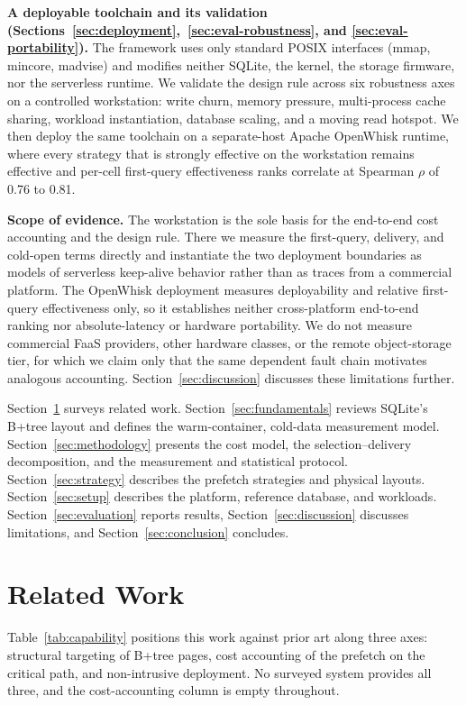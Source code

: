 \documentclass[sigconf, nonacm]{acmart}
\begin{document}
\textbf{A deployable toolchain and its validation (Sections~\ref{sec:deployment},~\ref{sec:eval-robustness}, and \ref{sec:eval-portability}).} The framework uses only standard POSIX interfaces (mmap, mincore, madvise) and modifies neither SQLite, the kernel, the storage firmware, nor the serverless runtime. We validate the design rule across six robustness axes on a controlled workstation: write churn, memory pressure, multi-process cache sharing, workload instantiation, database scaling, and a moving read hotspot. We then deploy the same toolchain on a separate-host Apache OpenWhisk runtime, where every strategy that is strongly effective on the workstation remains effective and per-cell first-query effectiveness ranks correlate at Spearman $\rho$ of 0.76 to 0.81.

\textbf{Scope of evidence.} The workstation is the sole basis for the end-to-end cost accounting and the design rule. There we measure the first-query, delivery, and cold-open terms directly and instantiate the two deployment boundaries as models of serverless keep-alive behavior rather than as traces from a commercial platform. The OpenWhisk deployment measures deployability and relative first-query effectiveness only, so it establishes neither cross-platform end-to-end ranking nor absolute-latency or hardware portability. We do not measure commercial FaaS providers, other hardware classes, or the remote object-storage tier, for which we claim only that the same dependent fault chain motivates analogous accounting. Section~\ref{sec:discussion} discusses these limitations further.

Section~\ref{sec:related} surveys related work. Section~\ref{sec:fundamentals} reviews SQLite's B+tree layout and defines the warm-container, cold-data measurement model. Section~\ref{sec:methodology} presents the cost model, the selection–delivery decomposition, and the measurement and statistical protocol. Section~\ref{sec:strategy} describes the prefetch strategies and physical layouts. Section~\ref{sec:setup} describes the platform, reference database, and workloads. Section~\ref{sec:evaluation} reports results, Section~\ref{sec:discussion} discusses limitations, and Section~\ref{sec:conclusion} concludes.

\section{Related Work}\label{sec:related}

Table~\ref{tab:capability} positions this work against prior art along three axes: structural targeting of B+tree pages, cost accounting of the prefetch on the critical path, and non-intrusive deployment. No surveyed system provides all three, and the cost-accounting column is empty throughout.
\end{document}
